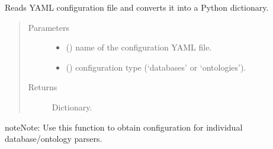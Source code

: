 \documentclass[letterpaper,10pt,english]{sphinxmanual}
\begin{document}
\begin{fulllineitems}
\label{\detokenize{_autosummary/graphdb_builder:graphdb_builder.builder_utils.get_config}}
Reads YAML configuration file and converts it into a Python dictionary.
\begin{quote}\begin{description}
\item[{Parameters}] \leavevmode\begin{itemize}
\item {} 
 () \textendash{} name of the configuration YAML file.

\item {} 
 () \textendash{} configuration type (‘databases’ or ‘ontologies’).

\end{itemize}

\item[{Returns}] \leavevmode
Dictionary.

\end{description}\end{quote}

\begin{sphinxadmonition}{note}{Note:}
Use this function to obtain configuration for individual database/ontology parsers.
\end{sphinxadmonition}

\end{fulllineitems}

\end{document}
